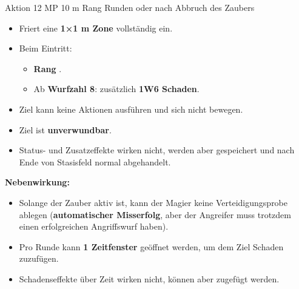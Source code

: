 \spellcard
{}
{Aktion}
{12 MP}
{10 m}
{Rang Runden oder nach Abbruch des Zaubers}
{
	\begin{itemize}
		\item Friert eine \textbf{1×1 m Zone} vollständig ein.
		\item Beim Eintritt:
		\begin{itemize}
			\item \textbf{Rang} .
			\item Ab \textbf{Wurfzahl 8}: zusätzlich \textbf{1W6 Schaden}.
		\end{itemize}
		\item Ziel kann keine Aktionen ausführen und sich nicht bewegen.
		\item Ziel ist \textbf{unverwundbar}.
		\item Status- und Zusatzeffekte wirken nicht,
		werden aber gespeichert und nach Ende von Stasisfeld normal abgehandelt.
	\end{itemize}
	
	\medskip
	\textbf{Nebenwirkung:}
	\begin{itemize}
		\item Solange der Zauber aktiv ist, kann der Magier keine Verteidigungsprobe ablegen
		(\textbf{automatischer Misserfolg}, aber der Angreifer muss trotzdem einen erfolgreichen Angriffswurf haben).
	\end{itemize}
}
{
	\begin{itemize}
		\item Pro Runde kann \textbf{1 Zeitfenster} geöffnet werden,
		um dem Ziel Schaden zuzufügen.
		\item Schadenseffekte über Zeit wirken nicht,
		können aber zugefügt werden.
	\end{itemize}
}
